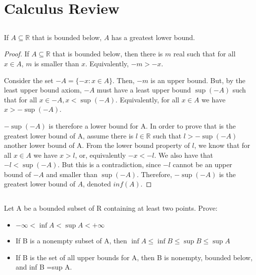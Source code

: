 \section{Calculus Review}

\subsection{}
If $A \subseteq \mathbb{R}$ that is bounded below, $A$ has a greatest lower bound.


\begin{proof}

If $A \subseteq \mathbb{R}$ that is bounded below, then there is $m$ real such that for all $x \in A$, $m$ is smaller than $x$. Equivalently, $-m > -x$.

Consider the set $-A = \{-x : x \in A\}$. Then, $-m$ is an upper bound. But, by the least upper bound axiom, $-A$ must have a least upper bound $\sup(-A)$ such that for all $x \in -A, x < \sup(-A)$. Equivalently, for all $x \in A$ we have $x > -\sup(-A)$.

$-\sup(-A)$ is therefore a lower bound for A. In order to prove that is the greatest lower bound of A, assume there is $l \in \mathbb{R}$ such that $l > -\sup(-A)$ another lower bound of A. From the lower bound property of $l$, we know that for all $x \in A$ we have $x > l$, or, equivalently $-x < -l$. We also have that $-l < \sup(-A)$. But this is a contradiction, since $-l$ cannot be an upper bound of $-A$ and smaller than $\sup(-A)$. Therefore, $-\sup(-A)$ is the greatest lower bound of $A$, denoted $inf(A)$.

\end{proof}

\subsection{}
Let A be a bounded subset of R containing at least two points. Prove:
\begin{itemize}
\item $-\infty < \inf A < \sup A < +\infty$
\item If B is a   nonempty subset of A, then $\inf A \leq \inf B \leq \sup B \leq \sup A$
\item If B is the set of all  upper bounds for A, then B is nonempty, bounded below, and inf B =sup A.
\end{itemize}

